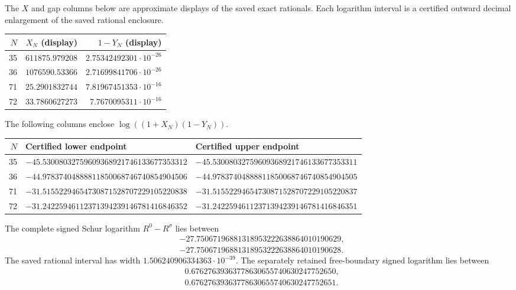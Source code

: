 The $X$ and gap columns below are approximate displays of the saved exact
rationals. Each logarithm interval is a certified outward decimal
enlargement of the saved rational enclosure.
\begin{center}
\begin{tabular}{rrr}
\toprule
$N$ & $X_N$ (display) & $1-Y_N$ (display)\\
\midrule
35 & $611875.979208$ & $2.75342492301\cdot10^{-26}$\\
36 & $1076590.53366$ & $2.71699841706\cdot10^{-26}$\\
71 & $25.2901832744$ & $7.81967451353\cdot10^{-16}$\\
72 & $33.7860627273$ & $7.7670095311\cdot10^{-16}$\\
\bottomrule
\end{tabular}
\end{center}
The following columns enclose $\log((1+X_N)(1-Y_N))$.
\begin{center}
\small
\setlength{\tabcolsep}{4pt}
\begin{tabular}{rll}
\toprule
$N$ & Certified lower endpoint & Certified upper endpoint\\
\midrule
35 & $-45.53008032759609368921746133677353312$ & $-45.53008032759609368921746133677353311$\\
36 & $-44.97837404888811850068746740854904506$ & $-44.97837404888811850068746740854904505$\\
71 & $-31.51552294654730871528707229105220838$ & $-31.51552294654730871528707229105220837$\\
72 & $-31.24225946112371394239146781416846352$ & $-31.24225946112371394239146781416846351$\\
\bottomrule
\end{tabular}
\end{center}
The complete signed Schur logarithm $R^0-R^\sigma$ lies between
\[
\begin{aligned}
&-27.75067196881318953222638864010190629,\\
&-27.75067196881318953222638864010190628.
\end{aligned}
\]
The saved rational interval has width $1.506240906334363\cdot10^{-39}$.
The separately retained free-boundary signed logarithm lies between
\[
\begin{aligned}
&0.67627639363778630655740630247752650,\\
&0.67627639363778630655740630247752651.
\end{aligned}
\]

